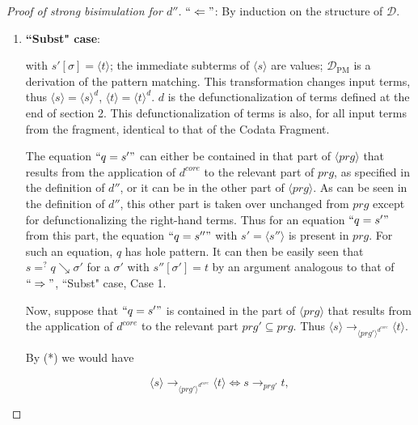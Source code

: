 \begin{proof}[Proof of strong bisimulation for $d''$]
$`` \Leftarrow "$: By induction on the structure of $\mathcal{D}$.

\begin{enumerate}
\item \textbf{``Subst" case}:

\begin{prooftree}
\end{prooftree}

with $s'[\sigma] = \langle t \rangle$; the immediate subterms of $\langle s \rangle$ are values; $\mathcal{D}_{\textrm{PM}}$ is a derivation of the pattern matching. This transformation changes input terms, thus $\langle s \rangle = \langle s \rangle^d$, $\langle t \rangle = \langle t \rangle^d$. $d$ is the defunctionalization of terms defined at the end of section 2. This defunctionalization of terms is also, for all input terms from the fragment, identical to that of the Codata Fragment.

The equation $`` q = s' "$ can either be contained in that part of $\langle prg \rangle$ that results from the application of $d^{core}$ to the relevant part of $prg$, as specified in the definition of $d''$, or it can be in the other part of $\langle prg \rangle$. As can be seen in the definition of $d''$, this other part is taken over unchanged from $prg$ except for defunctionalizing the right-hand terms. Thus for an equation $`` q = s' "$ from this part, the equation $`` q = s'' "$ with $s' = \langle s'' \rangle$ is present in $prg$. For such an equation, $q$ has hole pattern. It can then be easily seen that $s =^? q \searrow \sigma'$ for a $\sigma'$ with $s''[\sigma'] = t$ by an argument analogous to that of $`` \Rightarrow "$, ``Subst" case, Case 1.

Now, suppose that $`` q = s' "$ is contained in the part of $\langle prg \rangle$ that results from the application of $d^{core}$ to the relevant part $prg' \subseteq prg$. Thus $\langle s \rangle \longrightarrow_{\langle prg' \rangle^{d^{core}}} \langle t \rangle$.

By (*) we would have

\begin{equation*}
\langle s \rangle \longrightarrow_{\langle prg' \rangle^{d^{core}}} \langle t \rangle \iff s \longrightarrow_{prg'} t,
\end{equation*}


\end{enumerate}
\end{proof}
